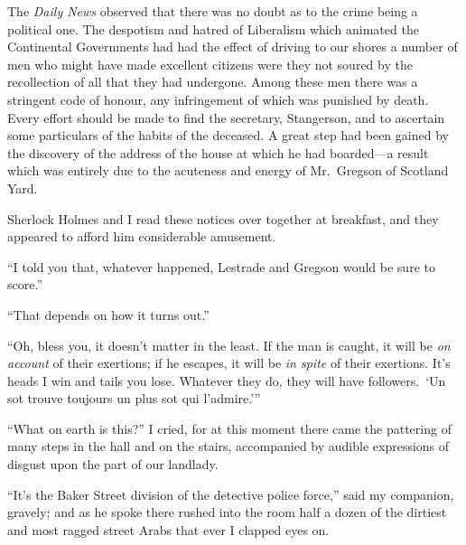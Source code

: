 \documentclass[12pt,english,oneside]{book}
\newcommand{\mdsh}[1]{\mbox{#1}\linebreak[1]}
\begin{document}
The \textit{Daily News} observed that there was no doubt as to the
crime being a political one. The despotism and hatred of Liberalism
which animated the Continental Governments had had the effect of driving
to our shores a number of men who might have made excellent citizens
were they not soured by the recollection of all that they had undergone.
Among these men there was a stringent code of honour, any infringement
of which was punished by death. Every effort should be made to find
the secretary, Stangerson, and to ascertain some particulars of the
habits of the deceased. A great step had been gained by the discovery
of the address of the house at which he had boarded\mdsh{---}a result
which was entirely due to the acuteness and energy of Mr.\ Gregson
of Scotland Yard.

Sherlock Holmes and I read these notices over together at breakfast,
and they appeared to afford him considerable amusement.

{}``I told you that, whatever happened, Lestrade and Gregson would
be sure to score.''

{}``That depends on how it turns out.''

{}``Oh, bless you, it doesn't matter in the least. If the man is
caught, it will be \textit{on account} of their exertions; if he escapes,
it will be \textit{in spite} of their exertions. It's heads I win
and tails you lose. Whatever they do, they will have followers.\ 
`Un sot trouve toujours un plus sot qui l'admire.'''

{}``What on earth is this?'' I cried, for at this moment there came
the pattering of many steps in the hall and on the stairs, accompanied
by audible expressions of disgust upon the part of our landlady.

{}``It's the Baker Street division of the detective police force,''
said my companion, gravely; and as he spoke there rushed into the
room half a dozen of the dirtiest and most ragged street Arabs that
ever I clapped eyes on.
\end{document}
